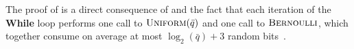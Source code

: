 The proof of  is a direct consequence of  and the fact that each iteration of the \textbf{While} loop performs one call to $\textsc{Uniform}(\bar{q})$ and one call to $\textsc{Bernoulli}$, which together consume on average at most $\log_2(\bar{q}) + 3$ random bits~\cite{Lumbroso13}.